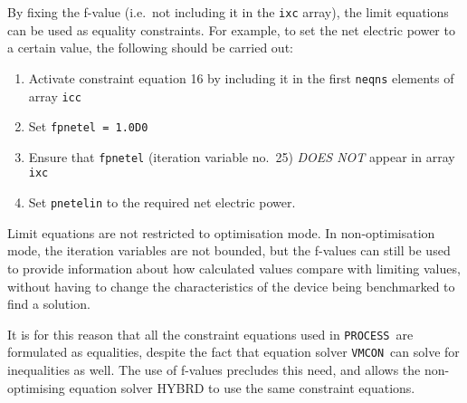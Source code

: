 \documentclass[11pt,a4paper]{report}
\newcommand{\process}{\mbox{\texttt{PROCESS}}}
\newcommand{\vmcon}{\mbox{\texttt{VMCON}}}
\renewcommand{\vec}[1]{\boldsymbol{#1}}
\begin{document}
By fixing the f-value (i.e.\ not including it in the \texttt{ixc} array), the
limit equations can be used as equality constraints. For example, to set the
net electric power to a certain value, the following should be carried out:
\begin{enumerate}
\item Activate constraint equation 16 by including it in the first
  \texttt{neqns} elements of array \texttt{icc}
\item Set \texttt{fpnetel = 1.0D0}
\item Ensure that \texttt{fpnetel} (iteration variable no.\ 25) \textit{DOES
    NOT}\/ appear in array \texttt{ixc}
\item Set \texttt{pnetelin} to the required net electric power.
\end{enumerate}

Limit equations are not restricted to optimisation mode. In non-optimisation
mode, the iteration variables are not bounded, but the f-values can still be
used to provide information about how calculated values compare with limiting
values, without having to change the characteristics of the device being
benchmarked to find a solution.

It is for this reason that all the constraint equations used in \process\ are
formulated as equalities, despite the fact that equation solver \vmcon\ can
solve for inequalities as well. The use of f-values precludes this need, and
allows the non-optimising equation solver HYBRD to use the same constraint
equations.

\label{sec:slack}
\end{document}
